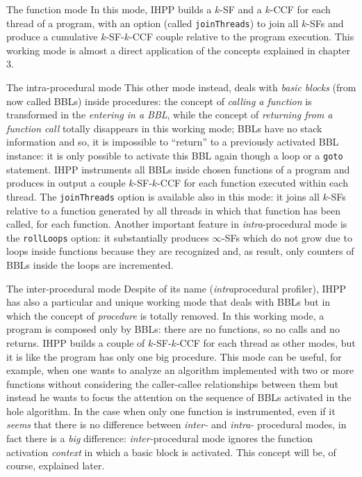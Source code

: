 \documentclass[a4paper,10pt]{report}
\begin{document}
\begin{paragraph}{The function mode}
In this mode, IHPP builds a $k$-SF and a $k$-CCF for each thread of a program,
with an option (called \verb|joinThreads|) to join all $k$-SFs and produce a cumulative $k$-SF-$k$-CCF couple relative to the program execution.
This working mode is almost a direct application of the concepts explained in chapter 3.
\end{paragraph}

\begin{paragraph}{The intra-procedural mode}
This other mode instead, deals with \emph{basic blocks} (from now called BBLs) inside procedures: the concept of \emph{calling a function} is transformed in the \emph{entering in a BBL}, while the concept of \emph{returning from a function call} totally disappears in this working mode; BBLs have no stack information and so, it is impossible to ``return'' to a previously activated BBL instance: it is only possible to activate this BBL again though a loop or a \verb|goto| statement.
IHPP instruments all BBLs inside chosen functions of a program and produces in output a couple $k$-SF-$k$-CCF for each function executed within each thread. The \verb|joinThreads| option is available also in this mode: it joins all $k$-SFs relative to a function generated by all threads in which that function has been called, for each function.
Another important feature in \emph{intra}-procedural mode is the \verb|rollLoops| option: it substantially produces $\infty$-SFs which do not grow due to loops inside functions because they are recognized and, as result, only counters of BBLs inside the loops are incremented.
\end{paragraph}

\begin{paragraph}{The inter-procedural mode}
Despite of its name (\emph{intra}procedural profiler), IHPP has also a particular and unique working mode that deals with BBLs but in which the concept of \emph{procedure} is totally removed. In this working mode, a program is composed only by BBLs: there are no functions, so no calls and no returns. IHPP builds a couple of $k$-SF-$k$-CCF for each thread as other modes, but it is like the program has only one big procedure. This mode can be useful, for example, when one wants to analyze an algorithm implemented with two or more functions without considering the caller-callee relationships between them but instead he wants to focus the attention on the sequence of BBLs activated in the hole algorithm. In the case when only one function is instrumented, even if it \emph{seems} that there is no difference between \emph{inter-} and \emph{intra-} procedural modes, in fact there is a \emph{big} difference: \emph{inter-}procedural mode ignores
the function activation \emph{context} in which a basic block is activated.
This concept will be, of course, explained later.
\end{paragraph}
\end{document}
